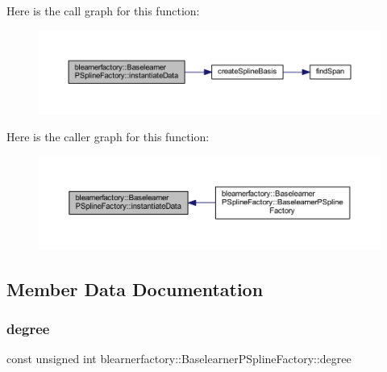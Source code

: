 Here is the call graph for this function\+:
\nopagebreak
\begin{figure}[H]
\begin{center}
\leavevmode
\includegraphics[width=350pt]{classblearnerfactory_1_1_baselearner_p_spline_factory_a8e9f7977906b310d21dda5cceb15c0d8_cgraph}
\end{center}
\end{figure}
Here is the caller graph for this function\+:
\nopagebreak
\begin{figure}[H]
\begin{center}
\leavevmode
\includegraphics[width=350pt]{classblearnerfactory_1_1_baselearner_p_spline_factory_a8e9f7977906b310d21dda5cceb15c0d8_icgraph}
\end{center}
\end{figure}


\subsection{Member Data Documentation}
\mbox{\label{classblearnerfactory_1_1_baselearner_p_spline_factory_aa245143409b64073ba36700c6868ece5}} 
\subsubsection{\texorpdfstring{degree}{degree}}
{\footnotesize\ttfamily const unsigned int blearnerfactory\+::\+Baselearner\+P\+Spline\+Factory\+::degree\hspace{0.3cm}{\ttfamily [private]}}



